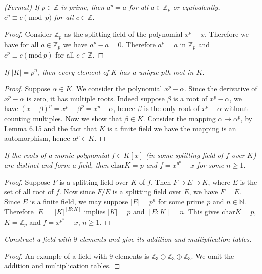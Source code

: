 \begin{problem}\em
(Fermat) If $p\in \mathbb{Z}$ is prime, then $a^p=a$ for all $a\in \mathbb{Z}_p$ or equivalently, $c^p\equiv c\pmod{p}$ for all $c\in \mathbb{Z}$.
\end{problem}
\begin{proof}
Consider $\mathbb{Z}_p$ as the splitting field of the polynomial $x^p-x$. Therefore we have for all $a\in\mathbb{Z}_p$ we have $a^p-a=0$. Therefore $a^p=a$ in $\mathbb{Z}_p$ and $c^p\equiv c(\mathrm{mod}\ p)$ for all $c\in\mathbb{Z}$.
\end{proof}
\begin{problem}\em
If $|K|=p^n$, then every element of $K$ has a unique $p$th root in $K$.
\end{problem}
\begin{proof}
Suppose $\alpha\in K$. We consider the polynomial $x^p-\alpha$. Since the derivative of $x^p-\alpha$ is zero, it has multiple roots. Indeed suppose $\beta$ is a root of $x^p-\alpha$, we have $(x-\beta)^p=x^p-\beta^p=x^p-\alpha$, hence $\beta$ is the only root of $x^p-\alpha$ without counting multiples. Now we show that $\beta\in K$. Consider the mapping $\alpha\mapsto\alpha^p$, by Lemma 6.15 and the fact that $K$ is a finite field we have the mapping is an automorphism, hence $\alpha^p\in K$.
\end{proof}
\begin{problem}\em
If the roots of a monic polynomial $f\in K[x]$ (in some splitting field of $f$ over $K$) are distinct and form a field, then $\mathrm{char}K=p$ and $f=x^{p^n}-x$ for some $n\geq 1$.
\end{problem}
\begin{proof}
Suppose $F$ is a splitting field over $K$ of $f$. Then $F\supset E\supset K$, where $E$ is the set of all root of $f$. Now since $F/E$ is a splitting field over $E$, we have $F=E$. Since $E$ is a finite field, we may suppose $|E|=p^n$ for some prime $p$ and $n\in\mathbb{N}$. Therefore $|E|=|K|^{[E:K]}$ implies $|K|=p$ and $[E:K]=n$. This gives $\mathrm{char}K=p$, $K=\mathbb{Z}_p$ and $f=x^{p^n}-x$, $n\ge 1$.
\end{proof}
\begin{problem}\em
Construct a field with $9$ elements and give its addition and multiplication tables.
\end{problem}
\begin{proof}
An example of a field with $9$ elements is $\mathbb{Z}_3\oplus\mathbb{Z}_3\oplus\mathbb{Z}_3$. We omit the addition and multiplication tables.
\end{proof}
